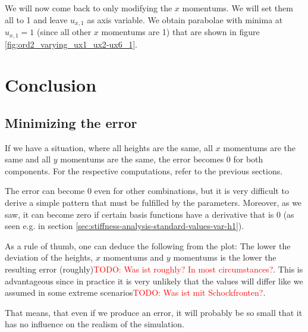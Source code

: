 \documentclass{article}
\newcommand{\todo}[2][]{\textcolor{red}{TODO\ifthenelse{\equal{#1}{}}{}{[#1]}: #2}}
\begin{document}
We will now come back to only modifying the $x$ momentums. We will set them all to 1 and leave $u_{x,1}$ as axis variable. We obtain parabolae with minima at $u_{x,1}=1$ (since all other $x$ momentums are 1) that are shown in figure \ref{fig:ord2_varying_ux1_ux2-ux6_1}.




\section{Conclusion}
\label{sec:stiffness-analysis-conclusion}

\subsection{Minimizing the error}
\label{sec:stiffness-analysis-concl-error-0}

If we have a situation, where all heights are the same, all $x$ momentums are the same and all $y$ momentums are the same, the error becomes 0 for both components. For the respective computations, refer to the previous sections.

The error can become 0 even for other combinations, but it is very difficult to derive a simple pattern that must be fulfilled by the parameters. Moreover, as we saw, it can become zero if certain basis functions have a derivative that is 0 (as seen e.g. in section \ref{sec:stiffness-analysis-standard-values-var-h1}).

As a rule of thumb, one can deduce the following from the plot: The lower the deviation of the heights, $x$ momentums and $y$ momentums is the lower the resulting error (roughly)\todo{Was ist roughly? In most circumstances?}. This is advantageous since in practice it is very unlikely that the values will differ like we assumed in some extreme scenarios\todo{Was ist mit Schockfronten?}.


That means, that even if we produce an error, it will probably be so small that it has no influence on the realism of the simulation.
\end{document}
